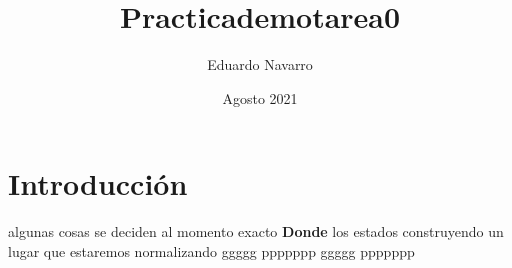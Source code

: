 \documentclass{article}
\title{Practicademotarea0}
\author{Eduardo Navarro}
\date{Agosto 2021}
\begin{document}
\maketitle

\section{Introducción}

algunas
cosas 
se deciden al momento
{\huge exacto \textbf{Donde} los estados {\normalsize construyendo} un lugar que} estaremos \normalsize normalizando  %
ggggg ppppppp
ggggg ppppppp
\end{document}
